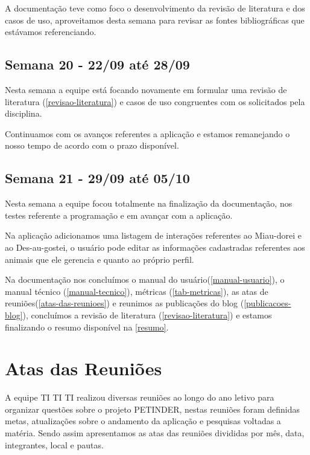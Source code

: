 \begin{apendicesenv}
\begin{flushleft}
A documentação teve como foco o desenvolvimento da revisão de literatura e dos casos de uso, aproveitamos desta semana para revisar as fontes bibliográficas que estávamos referenciando.
\end{flushleft}
\begin{flushleft}
 \section{Semana 20 - 22/09 até 28/09}
  Nesta semana a equipe está focando novamente em formular uma revisão de literatura (\autoref{revisao-literatura}) e casos de uso congruentes com os solicitados pela disciplina.

Continuamos com os avanços referentes a aplicação e estamos remanejando o nosso tempo de acordo com o prazo disponível.
\end{flushleft}

\begin{flushleft}
 \section{Semana 21 - 29/09 até 05/10}
   Nesta semana a equipe focou totalmente na finalização da documentação, nos testes referente a programação e em avançar com a aplicação.

Na aplicação adicionamos uma listagem de interações referentes ao \gls{Miau-dorei} e ao \gls{Des-au-gostei}, o usuário pode editar as informações cadastradas referentes aos animais que ele gerencia e quanto ao próprio perfil.

Na documentação nos concluímos o manual do usuário(\autoref{manual-usuario}), o manual técnico (\autoref{manual-tecnico}), métricas (\autoref{tab-metricas}), as atas de reuniões(\autoref{atas-das-reunioes}) e reunimos as publicações do blog (\autoref{publicacoes-blog}), concluímos a revisão de literatura (\autoref{revisao-literatura}) e estamos finalizando o resumo disponível na \autoref{resumo}.
\end{flushleft}

\chapter{Atas das Reuniões}
\label{atas-das-reunioes}
\begin{flushleft}
A equipe TI TI TI realizou diversas reuniões ao longo do ano letivo para organizar questões sobre o projeto PETINDER, nestas reuniões foram definidas metas, atualizações sobre o andamento da aplicação e pesquisas voltadas a matéria.
Sendo assim apresentamos as atas das reuniões divididas por mês, data, integrantes, local e pautas. 
\end{flushleft}


\end{apendicesenv}
